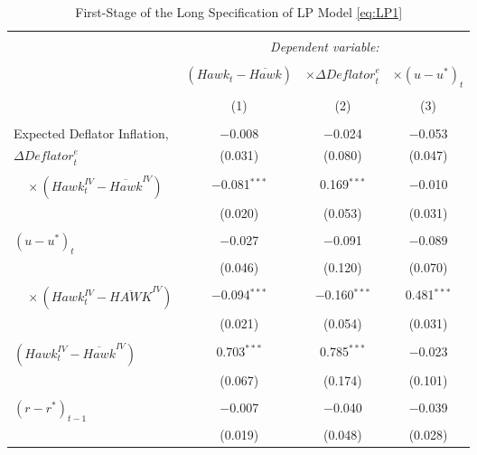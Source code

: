 \documentclass[11pt]{article}
\begin{document}
    \begin{table}[!htbp] \centering \scriptsize 
      \begin{threeparttable}
      \caption{First-Stage of the Long Specification of LP Model \eqref{eq:LP1}} 
      \label{tab:fs_long} 
    \begin{tabular}{@{\extracolsep{5pt}}lccc} 
    \\[-1.8ex]\hline 
    \hline \\[-1.8ex] 
    & \multicolumn{3}{c}{\textit{Dependent variable:}} \\ 
    \cline{2-4} 
    \\[-1.8ex] & $\left(\mathit{Hawk}_t-\overline{\mathit{Hawk}}\right)$ &  $\times \Delta\mathit{Deflator}_t^e$ & $\times (u-u^*)_{t}$ \\ 
    \\[-1.8ex] & (1) & (2) & (3)\\ 
    \hline \\[-1.8ex] 
    Expected Deflator Inflation, & $-$0.008 & $-$0.024 & $-$0.053 \\ 
    $\Delta\mathit{Deflator}_t^e$ & (0.031) & (0.080) & (0.047) \\ 
      & & & \\ 
    $\quad \times \left(\mathit{Hawk}_t^\mathit{IV}-\overline{\mathit{Hawk}}^\mathit{IV}\right)$& $-$0.081$^{***}$ & 0.169$^{***}$ & $-$0.010 \\ 
      & (0.020) & (0.053) & (0.031) \\ 
      & & & \\ 
    $(u-u^*)_{t}$ & $-$0.027 & $-$0.091 & $-$0.089 \\ 
    & (0.046) & (0.120) & (0.070) \\ 
    & & & \\ 
    $\quad \times \left(\mathit{Hawk}_t^\mathit{IV}-\overline{\mathit{HAWK}}^\mathit{IV}\right)$& $-$0.094$^{***}$ & $-$0.160$^{***}$ & 0.481$^{***}$ \\ 
    & (0.021) & (0.054) & (0.031) \\ 
    & & & \\ 
    $\left(\mathit{Hawk}_t^\mathit{IV}-\overline{\mathit{Hawk}}^\mathit{IV}\right)$ & 0.703$^{***}$ & 0.785$^{***}$ & $-$0.023 \\ 
    & (0.067) & (0.174) & (0.101) \\ 
    & & & \\ 
    $\left(r-r^*\right)_{t-1}$ & $-$0.007 & $-$0.040 & $-$0.039 \\ 
      & (0.019) & (0.048) & (0.028) \\ 

\end{tabular}
\end{threeparttable}
\end{table}
\end{document}
